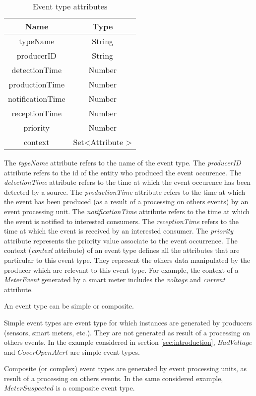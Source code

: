 \documentclass[a4paper,twoside]{article}
\begin{document}
\begin{table}[h]
\caption{Event type attributes}\label{tab:eventType} \centering
\begin{tabular}{|c|c|}
 \hline
  Name & Type \\
  \hline
  typeName & String \\
  \hline
  producerID & String \\
  \hline
  detectionTime & Number \\
  \hline
  productionTime & Number \\
  \hline
  notificationTime & Number \\
  \hline
  receptionTime & Number \\
  \hline
  priority & Number \\
  \hline
  context & Set\textless Attribute \textgreater \\
  \hline
\end{tabular}
\end{table}
The \textit{typeName} attribute refers to the name of the event type. The \textit{producerID} attribute refers to the id of the entity who produced the event occurence. The \textit{detectionTime} attribute refers to the time at which the event occurence has been detected by a source. The \textit{productionTime} attribute refers to the time at which the event has been produced (as a result of a processing on others events) by an event processing unit. The \textit{notificationTime} attribute refers to the time at which the event is notified to interested consumers. The \textit{receptionTime} refers to the time at which the event is received by an interested consumer. The \textit{priority} attribute represents the priority value associate to the event occurrence. The context (\textit{context} attribute) of an event type defines all the attributes that are particular to this event type. They represent the others data manipulated by the producer which are relevant to this event type. For example, the context of a \textit{MeterEvent} generated by a smart meter includes the \textit{voltage} and \textit{current} attribute.  

An event type can be simple or composite. 

Simple event types are event type for which instances are generated by producers (sensors, smart meters, etc.). They are not generated as result of a processing on others events. In the example considered in section \ref{sec:introduction}, $BadVoltage$ and $CoverOpenAlert$ are simple event types. 

Composite (or complex) event types are generated by event processing units, as result of a processing on others events. In the same considered example, $MeterSuspected$ is a composite event type. 
\end{document}
